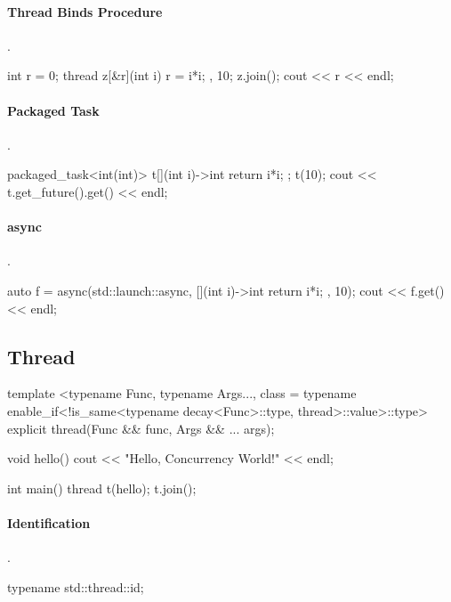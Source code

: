 \paragraph{Thread Binds Procedure}{.}
\begin{code}
int r = 0;
thread z{[&r](int i){ r = i*i; }, 10};
z.join();
cout << r << endl;
\end{code}

\paragraph{Packaged Task}{.}
\begin{code}
packaged_task<int(int)> t{[](int i)->int{ return i*i; }};
t(10);
cout << t.get_future().get() << endl;
\end{code}

\paragraph{async}{.}
\begin{code}
auto f = async(std::launch::async, [](int i)->int{ return i*i; }, 10);
cout << f.get() << endl;
\end{code}

\subsection*{Thread}

\begin{nametabler}
\end{nametabler}

\begin{code}
template <typename Func, typename Args..., class = typename
enable_if<!is_same<typename decay<Func>::type, thread>::value>::type>
explicit thread(Func && func, Args && ... args);

void hello()
{
  cout << "Hello, Concurrency World!" << endl;
}

int main()
{
  thread t(hello);
  t.join();
}
\end{code}

\paragraph{Identification}{.}
\begin{code}
typename std::thread::id;
\end{code}

